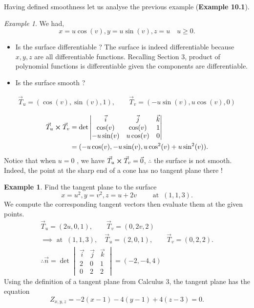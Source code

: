\documentclass[
	12pt,
	]{article}
\theoremstyle{custom}
\theoremstyle{custom}
\theoremstyle{custom}
\theoremstyle{custom}
\theoremstyle{custom}
\theoremstyle{definition}
\newtheorem{example}{Example}[section]
\theoremstyle{example}
\theoremstyle{note}
\theoremstyle{remark}
\theoremstyle{example}
\newtheorem*{example*}{Example}
\newcounter{theo}[section]\setcounter{theo}{0}
\numberwithin{equation}{subsection}
\begin{document}
				\noindent Having defined smoothness let us analyse the previous example (\textbf{Example 10.1}).
				\begin{example*}
					We had,
						$$ x = u\cos (v) , y= u \sin (v) , z = u \quad u\ge 0.$$
					\begin{itemize}
						\item Is the surface differentiable ? The surface is indeed differentiable because $x,y,z$ are all differentiable functions. Recalling Section 3, product of polynomial functions is differentiable given the components are differentiable.
						\item Is the surface smooth ? 
					\end{itemize}
					\begin{gather*}
						\vec{T}_{u} = (\cos(v),\sin(v),1) ,\qquad \vec{T}_{v} = (-u\sin(v), u\cos(v), 0)\\
					\end{gather*}
					\vspace{-1.5cm}
					\begin{align*}
						\vec{T}_{u} \cross \vec{T}_{v} &= \det 
						\begin{vmatrix}
							\vec{i} & \vec{j} & \vec{k} \\
							\cos(v) & \cos(v) & 1 \\
							-u\sin(v) & u\cos(v) & 0
						\end{vmatrix} \\
						&= (-u \cos(v) ,-u\sin(v), u\cos^{2}(v) + u\sin^{2}(v)).
					\end{align*}
					Notice that when $u=0$ , we have $\vec{T}_{u} \cross \vec{T}_{v} = \vec{0}$, $\therefore$ the surface is not smooth. Indeed, the point at the sharp end of a cone has no tangent plane there !
				\end{example*}
				\begin{example}
					Find the tangent plane to the surface 
					$$ x = u^{2} , y=v^{2} , z= u+2v \qquad \text{ at } \ (1,1,3).$$
					We compute the corresponding tangent vectors then evaluate them at the given points.
					\begin{gather*}
						\vec{T}_{u} = (2u , 0 ,1) ,\qquad \vec{T}_{v} = (0,2v,2) \\
						\implies \text{ at } \ (1,1,3) ,\quad \vec{T}_{u} =(2,0,1) ,\qquad \vec{T}_{v}=(0,2,2).\\
						\therefore \vec{n} = \det 
						\begin{vmatrix}
							\vec{i} & \vec{j} &\vec{k} \\
							2 & 0 & 1 \\
							0& 2&2
						\end{vmatrix} =(-2,-4,4)
					\end{gather*}
					Using the definition of a tangent plane from Calculus 3, the tangent plane has the equation 
					$$ Z_{x,y,z} = -2(x-1) -4(y-1) + 4(z-3) =0.$$
				\end{example}
				
\end{document}
